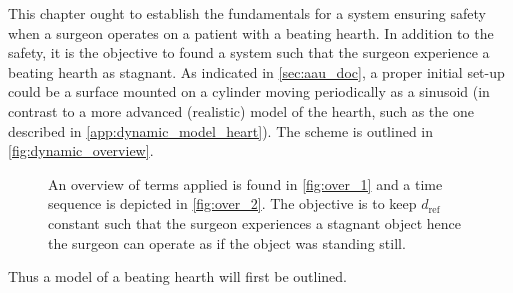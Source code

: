 This chapter ought to establish the fundamentals for a system ensuring safety when a surgeon operates on a patient with a beating hearth. In addition to the safety, it is the objective to found a system such that the surgeon experience a beating hearth as stagnant. As indicated in \autoref{sec:aau_doc}, a proper initial set-up could be a surface mounted on a cylinder moving periodically as a sinusoid (in contrast to a more advanced (realistic) model of the hearth, such as the one described in \autoref{app:dynamic_model_heart}). The scheme is outlined in \autoref{fig:dynamic_overview}.
\begin{figure}[H]
 \hspace{0.5cm}
%
\caption{An overview of terms applied is found in \autoref{fig:over_1} and a time sequence is depicted in \autoref{fig:over_2}. The objective is to keep $d_\text{ref}$ constant such that the surgeon experiences a stagnant object hence the surgeon can operate as if the object was standing still.}
\label{fig:dynamic_overview}
\end{figure}
Thus a model of a beating hearth will first be outlined.
